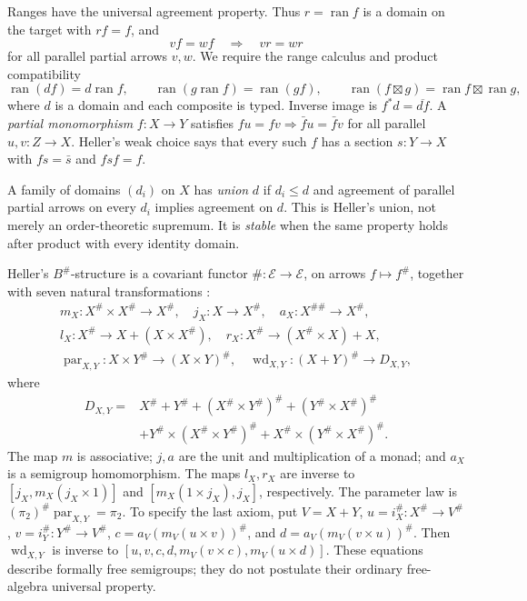 \documentclass[11pt]{article}
\theoremstyle{definition}\newtheorem{definition}[theorem]{Definition}
\theoremstyle{remark}\newtheorem{remark}[theorem]{Remark}
\newcommand{\E}{\mathscr E}
\newcommand{\ran}{\operatorname{ran}}
\begin{document}
Ranges have the universal agreement property. Thus $r=\ran f$ is a
domain on the target with $rf=f$, and
\[
 vf=wf\quad\Longrightarrow\quad vr=wr
\]
for all parallel partial arrows $v,w$. We require the range calculus
and product compatibility
\begin{equation}\label{eq:range-laws}
 \ran(df)=d\ran f,\qquad
 \ran(g\ran f)=\ran(gf),\qquad
 \ran(f\boxtimes g)=\ran f\boxtimes\ran g,
\end{equation}
where $d$ is a domain and each composite is typed. Inverse image is
$f^*d=\overline{df}$. A \emph{partial monomorphism} $f:X\to Y$
satisfies $fu=fv\Rightarrow\bar f u=\bar f v$ for all parallel
$u,v:Z\to X$. Heller's weak choice says that every such $f$ has a
section $s:Y\to X$ with $fs=\bar s$ and $fsf=f$.

A family of domains $(d_i)$ on $X$ has \emph{union} $d$ if
$d_i\le d$ and agreement of parallel partial arrows on every $d_i$
implies agreement on $d$. This is Heller's union, not merely an
order-theoretic supremum. It is \emph{stable} when the same property
holds after product with every identity domain.

Heller's $B^\#$-structure is a covariant functor
$\#:\E\to\E$, on arrows $f\mapsto f^\#$, together with seven
natural transformations \cite[\S2, p.~1255]{Heller}:
\begin{gather*}
 m_X:X^\#\times X^\#\to X^\#,
 \quad j_X:X\to X^\#,
 \quad a_X:X^{\#\#}\to X^\#,\\
 l_X:X^\#\to X+(X\times X^\#),
 \quad r_X:X^\#\to(X^\#\times X)+X,\\
 \operatorname{par}_{X,Y}:X\times Y^\#\to(X\times Y)^\#,
 \quad \operatorname{wd}_{X,Y}:(X+Y)^\#\to D_{X,Y},
\end{gather*}
where
\begin{align*}
 D_{X,Y}={}&X^\#+Y^\#+(X^\#\times Y^\#)^\#
 +(Y^\#\times X^\#)^\#\\
 &+Y^\#\times(X^\#\times Y^\#)^\#
 +X^\#\times(Y^\#\times X^\#)^\#.
\end{align*}
The map $m$ is associative; $j,a$ are the unit and multiplication of
a monad; and $a_X$ is a semigroup homomorphism. The maps $l_X,r_X$
are inverse to $[j_X,m_X(j_X\times1)]$ and
$[m_X(1\times j_X),j_X]$, respectively. The parameter law is
$(\pi_2)^\#\operatorname{par}_{X,Y}=\pi_2$.
To specify the last axiom, put $V=X+Y$,
$u=i_X^\#:X^\#\to V^\#$, $v=i_Y^\#:Y^\#\to V^\#$,
$c=a_V(m_V(u\times v))^\#$, and
$d=a_V(m_V(v\times u))^\#$. Then $\operatorname{wd}_{X,Y}$ is
inverse to $[u,v,c,d,m_V(v\times c),m_V(u\times d)]$.
These equations describe formally free semigroups; they do not
postulate their ordinary free-algebra universal property.
\end{document}
